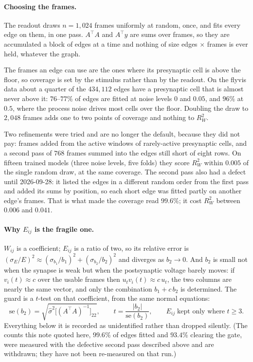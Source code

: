\documentclass[11pt,a4paper]{article}
\newcommand{\vi}{v_i}
\newcommand{\Wij}{W_{ij}}
\newcommand{\Eij}{E_{ij}}
\begin{document}
\paragraph{Choosing the frames.} The readout draws $n = 1{,}024$ frames uniformly
at random, once, and fits every edge on them, in one pass. $A^{\!\top}\!A$ and
$A^{\!\top}y$ are sums over frames, so they are accumulated a block of edges at a
time and nothing of size edges $\times$ frames is ever held, whatever the graph.

The frames an edge can use are the ones where its presynaptic cell is above the
floor, so coverage is set by the stimulus rather than by the readout. On the
flyvis data about a quarter of the $434{,}112$ edges have a presynaptic cell that
is almost never above it: $76$--$77\%$ of edges are fitted at noise levels
$0$ and $0.05$, and $96\%$ at $0.5$, where the process noise drives most cells
over the floor. Doubling the draw to $2{,}048$ frames adds one to two points of
coverage and nothing to $R^2_{W}$.

Two refinements were tried and are no longer the default, because they did not
pay: frames added from the active windows of rarely-active presynaptic cells,
and a second pass of $768$ frames summed into the edges still short of eight
rows. On fifteen trained models (three noise levels, five folds) they score
$R^2_{W}$ within $0.005$ of the single random draw, at the same coverage. The
second pass also had a defect until 2026-09-28: it listed the edges in a
different random order from the first pass and added its sums by position, so
each short edge was fitted partly on another edge's frames. That is what made
the coverage read $99.6\%$; it cost $R^2_{W}$ between $0.006$ and $0.041$.

\paragraph{Why $\Eij$ is the fragile one.} $\Wij$ is a coefficient; $\Eij$ is a
ratio of two, so its relative error is
$(\sigma_E/E)^2 \approx (\sigma_{b_1}/b_1)^2 + (\sigma_{b_2}/b_2)^2$ and diverges
as $b_2 \to 0$. And $b_2$ is small not when the synapse is weak but when the
postsynaptic voltage barely moves: if $\vi(t) \approx c$ over the usable frames
then $u_t \vi(t) \approx c\,u_t$, the two columns are nearly the same vector,
and only the combination $b_1 + c\,b_2$ is determined. The guard is a $t$-test
on that coefficient, from the same normal equations:
%
\begin{equation}
\mathrm{se}(b_2) = \sqrt{\hat\sigma^2 \bigl[(A^{\!\top}\!A)^{-1}\bigr]_{22}},
\qquad
t = \frac{|b_2|}{\mathrm{se}(b_2)},
\qquad
\Eij \;\text{kept only where } t \ge 3 .
\label{eq:gate}
\end{equation}
%
Everything below it is recorded as unidentified rather than dropped silently.
(The counts this note quoted here, $99.6\%$ of edges fitted and $93.4\%$
clearing the gate, were measured with the defective second pass described above
and are withdrawn; they have not been re-measured on that run.)
\end{document}
